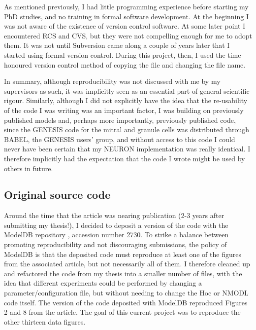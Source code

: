 As mentioned previously, I had little programming experience before starting my PhD studies,
and no training in formal software development.
At the beginning I was not aware of the existence of version control software.
At some later point I encountered RCS and CVS, but they were not compelling enough for me to adopt them.
It was not until Subversion came along a couple of years later that I started using formal version control.
During this project, then, I used the time-honoured version control method of copying the file and changing the file name.

In summary, although reproducibility was not discussed with me by my supervisors as such, it was implicitly seen as an essential part
of general scientific rigour.
Similarly, although I did not explicitly have the idea that the re-usability of the code I was writing was an important factor,
I was building on previously published models and, perhaps more importantly, previously published code, since the GENESIS code
for the mitral and granule cells was distributed through BABEL, the GENESIS users' group, and without access to this code I
could never have been certain that my NEURON implementation was really identical.
I therefore implicitly had the expectation that the code I wrote might be used by others in future.


\subsection{Original source code}

Around the time that the article was nearing publication (2-3 years after submitting my thesis!),
I decided to deposit a version of the code with the ModelDB repository \cite{Hines:2004},
 \href{http://modeldb.yale.edu/2730}{accession number 2730}.
To strike a balance between promoting reproducibility and not discouraging submissions,
the policy of ModelDB is that the deposited code must reproduce at least one of the figures
from the associated article, but not necessarily all of them.
I therefore cleaned up and refactored the code from my thesis into a smaller
number of files, with the idea that different experiments could be performed by changing a parameter/configuration file,
but without needing to change the Hoc or NMODL code itself. The version of the code deposited with ModelDB
reproduced Figures 2 and 8 from the article.
The goal of this current project was to reproduce the other thirteen data figures.

